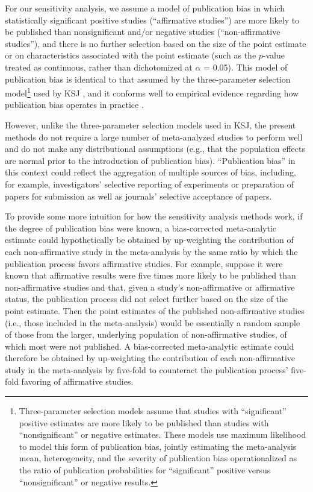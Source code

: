 \documentclass[man,floatsintext]{apa7}
\begin{document}
For our sensitivity analysis, we assume a model of publication bias in which  statistically significant positive studies (``affirmative studies'') are more likely to be published than nonsignificant and/or negative studies (``non-affirmative studies''), and there is no further selection based on the size of the point estimate or on characteristics associated with the point estimate (such as the $p$-value treated as continuous, rather than dichotomized at $\alpha$ = 0.05). This model of publication bias is identical to that assumed by the three-parameter selection model\footnote{Three-parameter selection models assume that studies with ``significant'' positive estimates are more likely to be published than studies with ``nonsignificant'' or negative estimates. These models use maximum likelihood to model this form of publication bias, jointly estimating the meta-analysis mean, heterogeneity, and the severity of publication bias operationalized as the ratio of publication probabilities for ``significant'' positive versus ``nonsignificant'' or negative results.} used by KSJ \parencite{vevea1995general}, and it conforms well to empirical evidence regarding how publication bias operates in practice \parencite{sapbe, gelman2014beyond, masicampo2012peculiar}. 

However, unlike the three-parameter selection models used in KSJ, the present methods do not require a large number of meta-analyzed studies to perform well \parencite{mcshane2016adjusting, carter2019correcting} and do not make any distributional assumptions (e.g., that the population effects are normal prior to the introduction of publication bias). ``Publication bias'' in this context could reflect the aggregation of multiple sources of bias, including, for example, investigators’ selective reporting of experiments or preparation of papers for submission as well as journals’ selective acceptance of papers. 

To provide some more intuition for how the sensitivity analysis methods work, if the degree of publication bias were known, a bias-corrected meta-analytic estimate could hypothetically be obtained by up-weighting the contribution of each non-affirmative study in the meta-analysis by the same ratio by which the publication process favors affirmative studies. For example, suppose it were known that affirmative results were five times more likely to be published than non-affirmative studies and that, given a study’s non-affirmative or affirmative status, the publication process did not select further based on the size of the point estimate. Then the point estimates of the published non-affirmative studies (i.e., those included in the meta-analysis) would be essentially a random sample of those from the larger, underlying population of non-affirmative studies, of which most were not published. A bias-corrected meta-analytic estimate could therefore be obtained by up-weighting the contribution of each non-affirmative study in the meta-analysis by five-fold to counteract the publication process’ five-fold favoring of affirmative studies.
\end{document}

